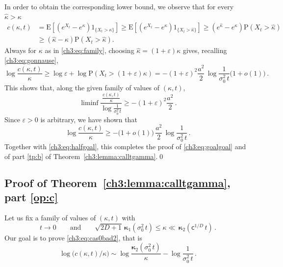 \documentclass[a4paper,reqno,11pt]{amsart}
\numberwithin{equation}{section}
\newcommand{\PEfont}{\mathrm}
\renewcommand{\P}{\ensuremath{\PEfont P}}
\newcommand{\E}{\ensuremath{\PEfont E}}
\renewcommand{\epsilon}{\varepsilon}
\newcommand\sfc{\mathsf{c}}
\newcommand\bkappa{\boldsymbol{\kappa}}
\begin{document}
In order to obtain the corresponding lower bound, we observe that for every $\hat\kappa >\kappa$
\begin{equation}\label{ch3:eq:lowerboundctgammafinale}
\begin{split}
c(\kappa,t) &= \E\left[\left(e^{X_t}-e^{\kappa} \right)1_{\{X_t>\kappa\}}\right]
\ge
\E\left[\left(e^{X_t}-e^{\kappa}\right)1_{\{X_t>
\hat\kappa\}}\right] \geq (e^{
\hat\kappa}-e^{\kappa})\P(X_t>
\hat\kappa)\\
&\geq (
\hat\kappa-\kappa)\P(X_t>\hat\kappa).
\end{split}
\end{equation}
Always for $\kappa$ as in \eqref{ch3:eq:family},
choosing $\hat\kappa = (1+\epsilon)\kappa$ gives, recalling \eqref{ch3:eq:gonnause},
\begin{equation} \label{ch3:eq:lbuff}
 \log \frac{c(\kappa,t)}{\kappa}
 \geq \log \epsilon + \log\P(X_t>(1+\epsilon)\kappa)
 =  -(1+\epsilon)^2 \frac{a^2}{2} \, \log \frac{1}{\sigma_0^2 \, t} \big(1+o(1)\big)\,.
\end{equation}
This shows that,
along the given family of values of $(\kappa,t)$,
\begin{equation*}
	\liminf \frac{\frac{c(\kappa,t)}{\kappa}}{\log \frac{1}{\sigma_0^2 \, t}}
	\ge - (1+\epsilon)^2 \frac{a^2}{2} \,.
\end{equation*}
Since $\epsilon > 0$ is arbitrary, we have shown that
\begin{equation}
 \log \frac{c(\kappa,t)}{\kappa}\geq - 
 \big(1+o(1)\big) \, \frac{a^2}{2} \, \log \frac{1}{ \sigma_0^2 \, t}\,.
\end{equation}
Together with \eqref{ch3:eq:halfgoal}, 
this completes the proof of \eqref{ch3:eq:goalgoal}
and of part \eqref{tp:b} of Theorem~\ref{ch3:lemma:calltgamma}.\qed

\subsection{Proof of  Theorem~\ref{ch3:lemma:calltgamma}, part \eqref{op:c}}

Let us fix a family of values of $(\kappa,t)$ with 
\begin{equation}\label{ch3:eq:familybis}
	t \to 0 \qquad\text{and}\qquad 
	\sqrt{2D+1}\, \bkappa_1(\sigma_0^2 \, t) \le \kappa \ll \, 
	\bkappa_2(\sfc^{1/D} \, t) \,.
\end{equation}
Our goal is to prove \eqref{ch3:eq:cas0bad2}, that is
\begin{equation}\label{ch3:eq:goalnew}
	\log \big( c(\kappa,t)/\kappa \big) \sim 
	\log \frac{\bkappa_2(\sigma_0^2 \, t)}{\kappa}
	- \log \frac{1}{\sigma_0^2 \, t}\,.
\end{equation}
\end{document}
